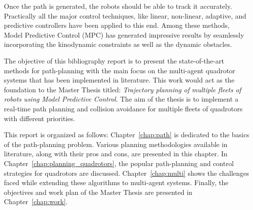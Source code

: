 Once the path is generated, the robots should be able to track it accurately. Practically all the major control techniques, like linear, non-linear, adaptive, and predictive controllers have been applied to this end. Among these methods, Model Predictive Control (MPC) has generated impressive results by seamlessly incorporating the kinodynamic constraints as well as the dynamic obstacles.

The objective of this bibliography report is to present the state-of-the-art methods for path-planning with the main focus on the multi-agent quadrotor systems that has been implemented in literature. This work would act as the foundation to the Master Thesis titled: \textit{Trajectory planning of multiple fleets of robots using Model Predictive Control}. The aim of the thesis is to implement a real-time path planning and collision avoidance for multiple fleets of quadrotors with different priorities. 


This report is organized as follows: Chapter~\ref{chap:path} is dedicated to the basics of the path-planning problem. Various planning methodologies available in literature, along with their pros and cons, are presented in this chapter. In Chapter~\ref{chap:planning_quadrotors}, the popular path-planning and control strategies for quadrotors are discussed. Chapter~\ref{chap:multi} shows the challenges faced while extending these algorithms to multi-agent systems. Finally, the objectives and work plan of the Master Thesis are presented in Chapter~\ref{chap:work}.